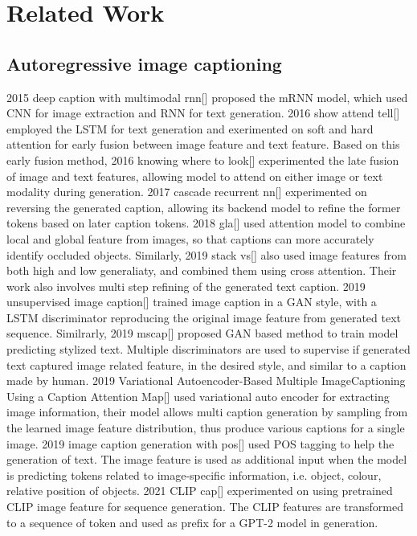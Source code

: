 \documentclass{article}
\begin{document}
\section{Related Work}
\label{sec:headings}

\subsection{Autoregressive image captioning}
2015 deep caption with multimodal rnn[] proposed the mRNN model, which used CNN for image extraction and RNN for text generation. 2016 show attend tell[] employed the LSTM for text generation and exerimented on soft and hard attention for early fusion between image feature and text feature. Based on this early fusion method, 2016 knowing where to look[] experimented the late fusion of image and text features, allowing model to attend on either image or text modality during generation. 2017 cascade recurrent nn[] experimented on reversing the generated caption, allowing its backend model to refine the former tokens based on later caption tokens. 2018 gla[] used attention model to combine local and global feature from images, so that captions can more accurately identify occluded objects. Similarly, 2019 stack vs[] also used image features from both high and low generaliaty, and combined them using cross attention. Their work also involves multi step refining of the generated text caption. 2019 unsupervised image caption[] trained image caption in a GAN style, with a LSTM discriminator reproducing the original image feature from generated text sequence. Similrarly, 2019 mscap[] proposed GAN based method to train model predicting stylized text. Multiple discriminators are used to supervise if generated text captured image related feature, in the desired style, and similar to a caption made by human. 2019 Variational Autoencoder-Based Multiple ImageCaptioning Using a Caption Attention Map[] used variational auto encoder for extracting image information, their model allows multi caption generation by sampling from the learned image feature distribution, thus produce various captions for a single image. 2019 image caption generation with pos[] used POS tagging to help the generation of text. The image feature is used as additional input when the model is predicting tokens related to image-specific information, i.e. object, colour, relative position of objects. 2021 CLIP cap[] experimented on using pretrained CLIP image feature for sequence generation. The CLIP features are transformed to a sequence of token and used as prefix for a GPT-2 model in generation. 
\end{document}
